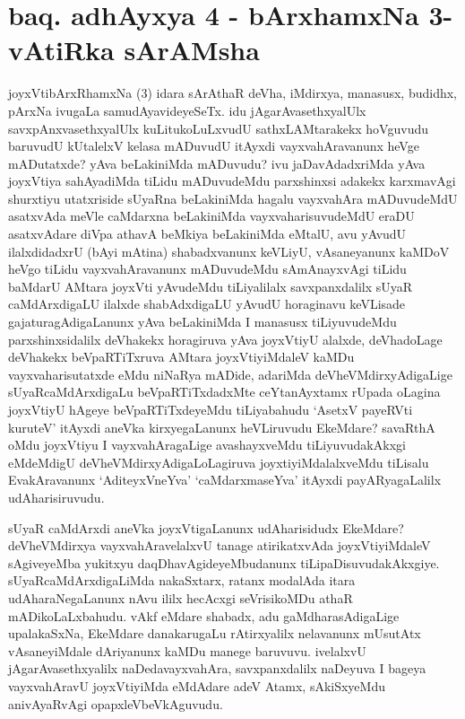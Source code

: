 \section*{baq. adhAyxya 4 - bArxhamxNa 3-vAtiRka sArAMsha}

\begin{artha}%
joyxVtibArxRhamxNa (3) idara sArAthaR deVha, iMdirxya, manasusx, budidhx, pArxNa ivugaLa samudAyavideyeSeTx. idu jAgarAvasethxyalUlx savxpAnxvasethxyalUlx kuLitukoLuLxvudU sathxLAMtarakekx hoVguvudu baruvudU kUtalelxV kelasa mADuvudU itAyxdi vayxvahAravanunx heVge mADutatxde? yAva beLakiniMda mADuvudu? ivu jaDavAdadxriMda yAva joyxVtiya sahAyadiMda tiLidu mADuvudeMdu parxshinxsi adakekx karxmavAgi shurxtiyu utatxriside sUyaRna beLakiniMda hagalu vayxvahAra mADuvudeMdU asatxvAda meVle caMdarxna beLakiniMda vayxvaharisuvudeMdU eraDU asatxvAdare diVpa athavA beMkiya beLakiniMda eMtalU, avu yAvudU ilalxdidadxrU (bAyi mAtina) shabadxvanunx keVLiyU, vAsaneyanunx kaMDoV heVgo tiLidu vayxvahAravanunx mADuvudeMdu sAmAnayxvAgi tiLidu baMdarU AMtara joyxVti yAvudeMdu tiLiyalilalx savxpanxdalilx sUyaR caMdArxdigaLU ilalxde shabAdxdigaLU yAvudU horaginavu keVLisade gajaturagAdigaLanunx yAva beLakiniMda I manasusx tiLiyuvudeMdu parxshinxsidalilx deVhakekx horagiruva yAva joyxVtiyU alalxde, deVhadoLage deVhakekx beVpaRTiTxruva AMtara joyxVtiyiMdaleV kaMDu vayxvaharisutatxde eMdu niNaRya mADide, adariMda deVheVMdirxyAdigaLige sUyaRcaMdArxdigaLu beVpaRTiTxdadxMte ceYtanAyxtamx rUpada oLagina joyxVtiyU hAgeye beVpaRTiTxdeyeMdu tiLiyabahudu `AsetxV payeRVti kuruteV' itAyxdi aneVka kirxyegaLanunx heVLiruvudu EkeMdare? savaRthA oMdu joyxVtiyu I vayxvahAragaLige avashayxveMdu tiLiyuvudakAkxgi eMdeMdigU deVheVMdirxyAdigaLoLagiruva joyxtiyiMdalalxveMdu tiLisalu EvakAravanunx `AditeyxVneYva' `caMdarxmaseYva' itAyxdi payARyagaLalilx udAharisiruvudu.
\end{artha}

\begin{artha}
sUyaR caMdArxdi aneVka joyxVtigaLanunx udAharisidudx EkeMdare? deVheVMdirxya vayxvahAravelalxvU tanage atirikatxvAda joyxVtiyiMdaleV sAgiveyeMba yukitxyu daqDhavAgideyeMbudanunx tiLipaDisuvudakAkxgiye. sUyaRcaMdArxdigaLiMda nakaSxtarx, ratanx modalAda itara udAharaNegaLanunx nAvu ililx hecAcxgi seVrisikoMDu athaR mADikoLaLxbahudu. vAkf eMdare shabadx, adu gaMdharasAdigaLige upalakaSxNa, EkeMdare danakarugaLu rAtirxyalilx nelavanunx mUsutAtx vAsaneyiMdale dAriyanunx kaMDu manege baruvuvu. ivelalxvU jAgarAvasethxyalilx naDedavayxvahAra, savxpanxdalilx naDeyuva I bageya vayxvahAravU joyxVtiyiMda eMdAdare adeV Atamx, sAkiSxyeMdu anivAyaRvAgi opapxleVbeVkAguvudu.
\end{artha}

